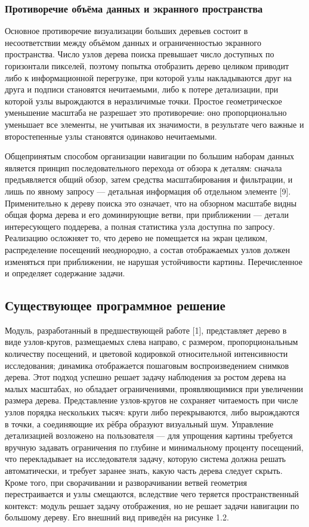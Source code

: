 \subsubsection{Противоречие объёма данных и экранного пространства}

Основное противоречие визуализации больших деревьев состоит в несоответствии между объёмом данных и ограниченностью экранного пространства. Число узлов дерева поиска превышает число доступных по горизонтали пикселей, поэтому попытка отобразить дерево целиком приводит либо к информационной перегрузке, при которой узлы накладываются друг на друга и подписи становятся нечитаемыми, либо к потере детализации, при которой узлы вырождаются в неразличимые точки. Простое геометрическое уменьшение масштаба не разрешает это противоречие: оно пропорционально уменьшает все элементы, не учитывая их значимости, в результате чего важные и второстепенные узлы становятся одинаково нечитаемыми.

Общепринятым способом организации навигации по большим наборам данных является принцип последовательного перехода от обзора к деталям: сначала предъявляется общий обзор, затем средства масштабирования и фильтрации, и лишь по явному запросу — детальная информация об отдельном элементе [9]. Применительно к дереву поиска это означает, что на обзорном масштабе видны общая форма дерева и его доминирующие ветви, при приближении — детали интересующего поддерева, а полная статистика узла доступна по запросу. Реализацию осложняет то, что дерево не помещается на экран целиком, распределение посещений неоднородно, а состав отображаемых узлов должен изменяться при приближении, не нарушая устойчивости картины. Перечисленное и определяет содержание задачи.

\subsection{Существующее программное решение}

Модуль, разработанный в предшествующей работе [1], представляет дерево в виде узлов-кругов, размещаемых слева направо, с размером, пропорциональным количеству посещений, и цветовой кодировкой относительной интенсивности исследования; динамика отображается пошаговым воспроизведением снимков дерева. Этот подход успешно решает задачу наблюдения за ростом дерева на малых масштабах, но обладает ограничениями, проявляющимися при увеличении размера дерева. Представление узлов-кругов не сохраняет читаемость при числе узлов порядка нескольких тысяч: круги либо перекрываются, либо вырождаются в точки, а соединяющие их рёбра образуют визуальный шум. Управление детализацией возложено на пользователя — для упрощения картины требуется вручную задавать ограничения по глубине и минимальному проценту посещений, что перекладывает на исследователя задачу, которую система должна решать автоматически, и требует заранее знать, какую часть дерева следует скрыть. Кроме того, при сворачивании и разворачивании ветвей геометрия перестраивается и узлы смещаются, вследствие чего теряется пространственный контекст: модуль решает задачу отображения, но не решает задачи навигации по большому дереву. Его внешний вид приведён на рисунке 1.2.

